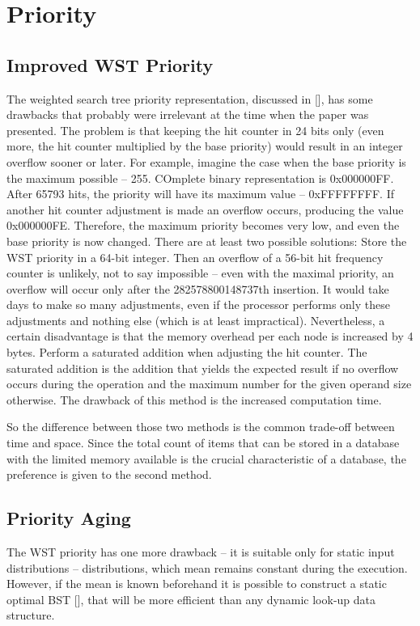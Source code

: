 \section{Priority}

\subsection{Improved WST Priority}
The weighted search tree priority representation, discussed in [], has some drawbacks that probably were irrelevant at the time when the paper was presented. The problem is that keeping the hit counter in 24 bits only (even more, the hit counter multiplied by the base priority) would result in an integer overflow sooner or later. For example, imagine the case when the base priority is the maximum possible – 255. COmplete binary representation is 0x000000FF. After 65793 hits, the priority will have its maximum value – 0xFFFFFFFF. If another hit counter adjustment is made an overflow occurs, producing the value 0x000000FE. Therefore, the maximum priority becomes very low, and even the base priority is now changed. There are at least two possible solutions:
Store the WST priority in a 64-bit integer. Then an overflow of a 56-bit hit frequency counter is unlikely, not to say impossible – even with the maximal priority, an overflow will occur only after the 282578800148737th insertion. It would take days to make so many adjustments, even if the processor performs only these adjustments and nothing else (which is at least impractical). Nevertheless, a certain disadvantage is that the memory overhead per each node is increased by 4 bytes.
Perform a saturated addition when adjusting the hit counter. The saturated addition is the addition that yields the expected result if no overflow occurs during the operation and the maximum number for the given operand size otherwise. The drawback of this method is the increased computation time.

So the difference between those two methods is the common trade-off between time and space. Since the total count of items that can be stored in a database with the limited memory available is the crucial characteristic of a database, the preference is given to the second method.


\subsection{Priority Aging}
The WST priority has one more drawback – it is suitable only for static input distributions – distributions, which mean remains constant during the execution. However, if the mean is known beforehand it is possible to construct a static optimal BST [], that will be more efficient than any dynamic look-up data structure.

